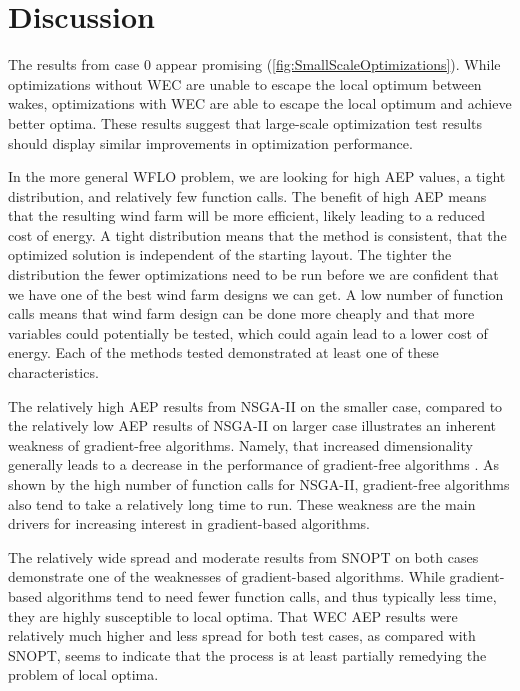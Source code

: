 \documentclass[a4paper]{jpconf}
\begin{document}
\section{Discussion}
The results from case 0 appear promising (\cref{fig:SmallScaleOptimizations}). While optimizations without WEC are unable to escape the local optimum between wakes, optimizations with WEC are able to escape the local optimum and achieve better optima. These  results suggest that large-scale optimization test results should display similar improvements in optimization performance.

In the more general WFLO problem, we are looking for high AEP values, a tight distribution, and relatively few function calls. The benefit of high AEP means that the resulting wind farm will be more efficient, likely leading to a reduced cost of energy. A tight distribution means that the method is consistent, that the optimized solution is independent of the starting layout. The tighter the distribution the fewer optimizations need to be run before we are confident that we have one of the best wind farm designs we can get. A low number of function calls means that wind farm design can be done more cheaply and that more variables could potentially be tested, which could again lead to a lower cost of energy. Each of the methods tested demonstrated at least one of these characteristics.

The relatively high AEP results from NSGA-II on the smaller case, compared to the relatively low AEP results of NSGA-II on larger case illustrates an inherent weakness of gradient-free algorithms. Namely, that increased dimensionality generally leads to a decrease in the performance of gradient-free algorithms \cite{rios2013-grad-free-comparison}. As shown by the high number of function calls for NSGA-II, gradient-free algorithms also tend to take a relatively long time to run. These weakness are the main drivers for increasing interest in gradient-based algorithms.

The relatively wide spread and moderate results from SNOPT on both cases demonstrate one of the weaknesses of gradient-based algorithms. While gradient-based algorithms tend to need fewer function calls, and thus typically less time, they are highly susceptible to local optima. That WEC AEP results were relatively much higher and less spread for both test cases, as compared with SNOPT, seems to indicate that the process is at least partially remedying the problem of local optima.
\end{document}
